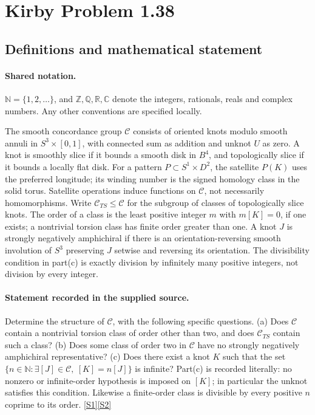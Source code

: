 \documentclass[11pt]{article}
\newcommand{\sref}[2]{\hyperlink{source:#1:#2}{[S#2]}}
\begin{document}
\section{Kirby Problem 1.38}\label{statement}

\subsection{Definitions and mathematical statement}

\paragraph{Shared notation.}$\mathbb N=\{1,2,\ldots\}$, and $\mathbb Z,\mathbb Q,\mathbb R,\mathbb C$ denote the integers, rationals, reals and complex numbers. Any other conventions are specified locally.


The smooth concordance group $\mathcal C$ consists of oriented knots modulo smooth annuli in $S^3\times[0,1]$, with connected sum as addition and unknot $U$ as zero. A knot is smoothly slice if it bounds a smooth disk in $B^4$, and topologically slice if it bounds a locally flat disk. For a pattern $P\subset S^1\times D^2$, the satellite $P(K)$ uses the preferred longitude; its winding number is the signed homology class in the solid torus. Satellite operations induce functions on $\mathcal C$, not necessarily homomorphisms. Write $\mathcal C_{TS}\leq\mathcal C$ for the subgroup of classes of topologically slice knots. The order of a class is the least positive integer $m$ with $m[K]=0$, if one exists; a nontrivial torsion class has finite order greater than one. A knot $J$ is strongly negatively amphichiral if there is an orientation-reversing smooth involution of $S^3$ preserving $J$ setwise and reversing its orientation. The divisibility condition in part(c) is exactly division by infinitely many positive integers, not division by every integer.
\paragraph{Statement recorded in the supplied source.}
Determine the structure of $\mathcal C$, with the following specific questions. (a) Does $\mathcal C$ contain a nontrivial torsion class of order other than two, and does $\mathcal C_{TS}$ contain such a class? (b) Does some class of order two in $\mathcal C$ have no strongly negatively amphichiral representative? (c) Does there exist a knot $K$ such that the set $\{n\in\mathbb N:\exists[J]\in\mathcal C,\ [K]=n[J]\}$ is infinite? Part(c) is recorded literally: no nonzero or infinite-order hypothesis is imposed on $[K]$; in particular the unknot satisfies this condition. Likewise a finite-order class is divisible by every positive $n$ coprime to its order. \sref{statement}{1}\sref{statement}{2}
\end{document}
